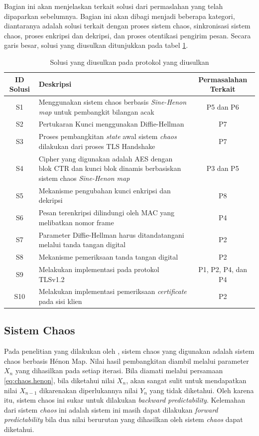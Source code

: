 Bagian ini akan menjelaskan terkait solusi dari permaslahan yang telah dipaparkan sebelumnya. Bagian ini akan dibagi menjadi beberapa kategori, diantaranya adalah solusi terkait dengan proses sistem chaos, sinkronisasi sistem chaos, proses enkripsi dan dekripsi, dan proses otentikasi pengirim pesan. Secara garis besar, solusi yang diusulkan ditunjukkan pada tabel \ref{tab:solusi}.

\begin{table}[!h]
  \centering
  \caption{Solusi yang diusulkan pada protokol yang diusulkan} \label{tab:solusi}
  \begin{tabular}{|c|p{6cm}|c|}
    \hline
    \textbf{ID Solusi} & \textbf{Deskripsi} & \textbf{Permasalahan Terkait} \\
    \hline
    S1 & Menggunakan sistem chaos berbasis \emph{Sine-Henon map} untuk pembangkit bilangan acak & P5 dan P6 \\ \hline
    S2 & Pertukaran Kunci menggunakan Diffie-Hellman & P7 \\ \hline
    S3 & Proses pembangkitan \emph{state} awal sistem \emph{chaos} dilakukan dari proses TLS Handshake & P7 \\ \hline
    S4 & Cipher yang digunakan adalah AES dengan blok CTR dan kunci blok dinamis berbasiskan sistem chaos \emph{Sine-Henon map} & P3 dan P5 \\ \hline
    S5 & Mekanisme pengubahan kunci enkripsi dan dekripsi & P8 \\ \hline
    S6 & Pesan terenkripsi dilindungi oleh MAC yang melibatkan nomor frame & P4 \\ \hline
    S7 & Parameter Diffie-Hellman harus ditandatangani melalui tanda tangan digital & P2 \\ \hline
    S8 & Mekanisme pemeriksaan tanda tangan digital & P2 \\ \hline
    S9 & Melakukan implementasi pada protokol TLSv1.2 & P1, P2, P4, dan P4 \\ \hline
    S10 & Melakukan implementasi pemeriksaan \emph{certificate} pada sisi klien & P2 \\ \hline
  \end{tabular}
\end{table}

\subsection{Sistem Chaos}

Pada penelitian yang dilakukan oleh \textcite{lin2021}, sistem chaos yang digunakan adalah sistem chaos berbasis Hénon Map. Nilai hasil pembangkitan diambil melalui parameter $X_n$ yang dihasilkan pada setiap iterasi. Bila diamati melalui persamaan \ref{eq:chaos.henon}, bila diketahui nilai $X_n$, akan sangat sulit untuk mendapatkan nilai $X_{n-1}$ dikarenakan diperlukannya nilai $Y_n$ yang tidak diketahui. Oleh karena itu, sistem chaos ini sukar untuk dilakukan \emph{backward predictability}. Kelemahan dari sistem \emph{chaos} ini adalah sistem ini masih dapat dilakukan \emph{forward predictability} bila dua nilai berurutan yang dihasilkan oleh sistem \emph{chaos} dapat diketahui. 

